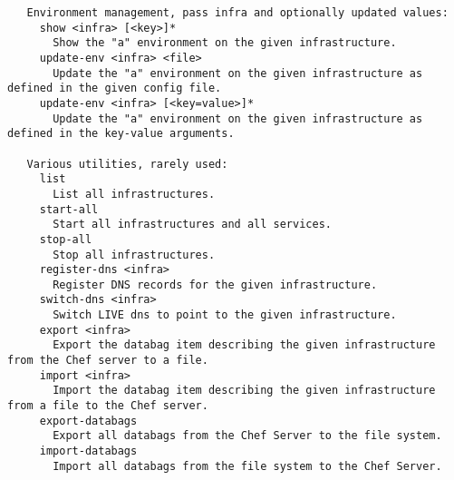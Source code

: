 \begin{verbatim}
   Environment management, pass infra and optionally updated values:
     show <infra> [<key>]*
       Show the "a" environment on the given infrastructure.
     update-env <infra> <file>
       Update the "a" environment on the given infrastructure as defined in the given config file.
     update-env <infra> [<key=value>]*
       Update the "a" environment on the given infrastructure as defined in the key-value arguments.

   Various utilities, rarely used:
     list
       List all infrastructures.
     start-all
       Start all infrastructures and all services.
     stop-all
       Stop all infrastructures.
     register-dns <infra>
       Register DNS records for the given infrastructure.
     switch-dns <infra>
       Switch LIVE dns to point to the given infrastructure.
     export <infra>
       Export the databag item describing the given infrastructure from the Chef server to a file.
     import <infra>
       Import the databag item describing the given infrastructure from a file to the Chef server.
     export-databags
       Export all databags from the Chef Server to the file system.
     import-databags
       Import all databags from the file system to the Chef Server.
\end{verbatim}
